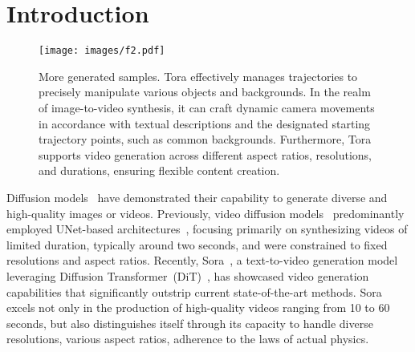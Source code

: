\section{Introduction}


\begin{figure*}[!t]
    \centering
    \texttt{[image: images/f2.pdf]}
    \caption{
         More generated samples. Tora effectively manages trajectories to precisely manipulate various objects and backgrounds. In the realm of image-to-video synthesis, it can craft dynamic camera movements in accordance with textual descriptions and the designated starting trajectory points, such as common backgrounds.  Furthermore, Tora supports video generation across different aspect ratios, resolutions, and durations, ensuring flexible content creation. 
    }
    \label{fig:2}   
\end{figure*}

Diffusion models~\cite{Dhariwal2021DiffusionMB, ramesh2022hierarchical} have demonstrated their capability to generate diverse and high-quality images or videos. Previously, video diffusion models~\cite{ho2022video, DBLP:journals/corr/abs-2311-15127,DBLP:journals/corr/abs-2311-04145} predominantly employed UNet-based architectures~\cite{ronneberger2015u}, focusing primarily on synthesizing videos of limited duration, typically around two seconds, and were constrained to fixed resolutions and aspect ratios. Recently, Sora~\cite{sora2024}, a text-to-video generation model leveraging Diffusion Transformer~(DiT)~\cite{peebles2023scalable}, has showcased video generation capabilities that significantly outstrip current state-of-the-art methods. Sora excels not only in the production of high-quality videos ranging from 10 to 60 seconds, but also distinguishes itself through its capacity to handle diverse resolutions, various aspect ratios, adherence to the laws of actual physics.


